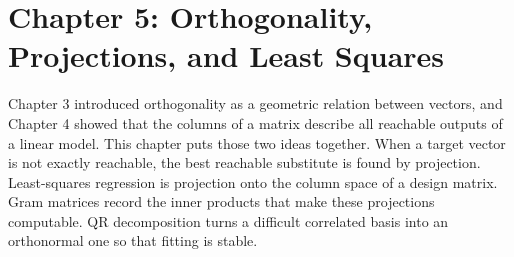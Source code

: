 \section{Chapter 5: Orthogonality, Projections, and Least Squares}
\label{ch:orthogonality-projections-least-squares}

Chapter 3 introduced orthogonality as a geometric relation between vectors, and Chapter 4 showed that the columns of a matrix describe all reachable outputs of a linear model. This chapter puts those two ideas together. When a target vector is not exactly reachable, the best reachable substitute is found by projection. Least-squares regression is projection onto the column space of a design matrix. Gram matrices record the inner products that make these projections computable. QR decomposition turns a difficult correlated basis into an orthonormal one so that fitting is stable.

